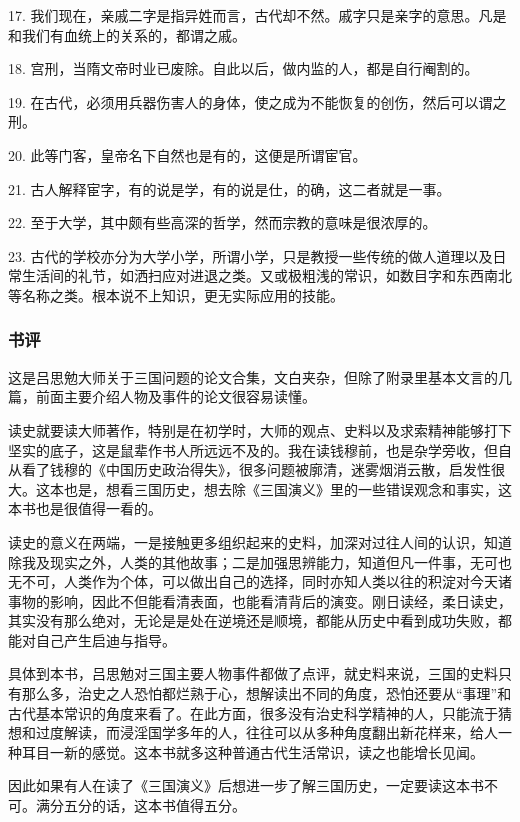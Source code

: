 17. 我们现在，亲戚二字是指异姓而言，古代却不然。戚字只是亲字的意思。凡是和我们有血统上的关系的，都谓之戚。

18. 宫刑，当隋文帝时业已废除。自此以后，做内监的人，都是自行阉割的。

19. 在古代，必须用兵器伤害人的身体，使之成为不能恢复的创伤，然后可以谓之刑。

20. 此等门客，皇帝名下自然也是有的，这便是所谓宦官。

21. 古人解释宦字，有的说是学，有的说是仕，的确，这二者就是一事。

22. 至于大学，其中颇有些高深的哲学，然而宗教的意味是很浓厚的。

23. 古代的学校亦分为大学小学，所谓小学，只是教授一些传统的做人道理以及日常生活间的礼节，如洒扫应对进退之类。又或极粗浅的常识，如数目字和东西南北等名称之类。根本说不上知识，更无实际应用的技能。

\subsubsection{书评}
这是吕思勉大师关于三国问题的论文合集，文白夹杂，但除了附录里基本文言的几篇，前面主要介绍人物及事件的论文很容易读懂。

读史就要读大师著作，特别是在初学时，大师的观点、史料以及求索精神能够打下坚实的底子，这是鼠辈作书人所远远不及的。我在读钱穆前，也是杂学旁收，但自从看了钱穆的《中国历史政治得失》，很多问题被廓清，迷雾烟消云散，启发性很大。这本也是，想看三国历史，想去除《三国演义》里的一些错误观念和事实，这本书也是很值得一看的。

读史的意义在两端，一是接触更多组织起来的史料，加深对过往人间的认识，知道除我及现实之外，人类的其他故事；二是加强思辨能力，知道但凡一件事，无可也无不可，人类作为个体，可以做出自己的选择，同时亦知人类以往的积淀对今天诸事物的影响，因此不但能看清表面，也能看清背后的演变。刚日读经，柔日读史，其实没有那么绝对，无论是是处在逆境还是顺境，都能从历史中看到成功失败，都能对自己产生启迪与指导。

具体到本书，吕思勉对三国主要人物事件都做了点评，就史料来说，三国的史料只有那么多，治史之人恐怕都烂熟于心，想解读出不同的角度，恐怕还要从“事理”和古代基本常识的角度来看了。在此方面，很多没有治史科学精神的人，只能流于猜想和过度解读，而浸淫国学多年的人，往往可以从多种角度翻出新花样来，给人一种耳目一新的感觉。这本书就多这种普通古代生活常识，读之也能增长见闻。

因此如果有人在读了《三国演义》后想进一步了解三国历史，一定要读这本书不可。满分五分的话，这本书值得五分。